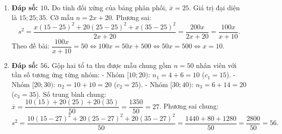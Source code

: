 \documentclass[12pt,a4paper]{article}
\begin{document}
\begin{enumerate}[start=11]
\item \textbf{Đáp số: $10$.}  
Do tính đối xứng của bảng phân phối, $\bar{x} = 25$. Giá trị đại diện là $15; 25; 35$. Cỡ mẫu $n = 2x + 20$.  
Phương sai:  
\[
s^2 = \dfrac{x(15 - 25)^2 + 20(25 - 25)^2 + x(35 - 25)^2}{2x + 20} = \dfrac{200x}{2x + 20} = \dfrac{100x}{x + 10}.
\]
Theo đề bài: $\dfrac{100x}{x + 10} = 50 \iff 100x = 50x + 500 \iff 50x = 500 \iff x = 10$.

\item \textbf{Đáp số: $56$.}  
Gộp hai tổ ta thu được mẫu chung gồm $n = 50$ nhân viên với tần số tương ứng từng nhóm:  
- Nhóm $[10; 20)$: $n_1 = 4 + 6 = 10$ ($c_1 = 15$).  
- Nhóm $[20; 30)$: $n_2 = 10 + 10 = 20$ ($c_2 = 25$).  
- Nhóm $[30; 40)$: $n_3 = 6 + 14 = 20$ ($c_3 = 35$).  
Số trung bình chung: $\bar{x} = \dfrac{10(15) + 20(25) + 20(35)}{50} = \dfrac{1350}{50} = 27$.  
Phương sai chung:  
\[
s^2 = \dfrac{10(15 - 27)^2 + 20(25 - 27)^2 + 20(35 - 27)^2}{50} = \dfrac{1440 + 80 + 1280}{50} = \dfrac{2800}{50} = 56.
\]
\end{enumerate}
\end{document}
